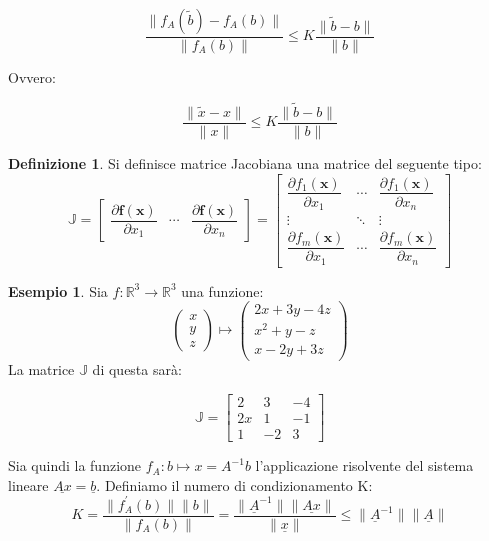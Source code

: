 \documentclass[12pt, a4paper]{book}
\theoremstyle{definition}
\newtheorem{exmp}{Esempio}[section]
\newtheorem{defn}{Definizione}[section]
\newcommand{\VarMtrx}[1]{\ensuremath{\underline{#1}}}
\begin{document}
\begin{flushleft}
\[ 
	\frac{ \lVert f_{A}(\tilde{b}) - f_{A}(b)\rVert }{ \lVert  f_{A}(b) \rVert} \leq K  \frac{ \lVert \tilde{b} - b \rVert }{ \lVert  b \rVert}
\]

Ovvero: 

\[ 
	\frac{ \lVert \tilde{x} - x \rVert }{ \lVert x \rVert} \leq K  \frac{ \lVert \tilde{b} - b \rVert }{ \lVert  b \rVert}
\]


\begin{defn}
Si definisce matrice Jacobiana una matrice del seguente tipo: 
\[
	\mathbb{J}=\left[\begin{array}{ccc}
	\dfrac{\partial \mathbf{f}(\mathbf{x})}{\partial x_{1}} & \cdots & \dfrac{\partial \mathbf{f}(\mathbf{x})}{\partial x_{n}}
	\end{array}\right]=\left[\begin{array}{ccc}
	\dfrac{\partial f_{1}(\mathbf{x})}{\partial x_{1}} & \cdots & \dfrac{\partial f_{1}(\mathbf{x})}{\partial x_{n}} \\
	\vdots & \ddots & \vdots \\
	\dfrac{\partial f_{m}(\mathbf{x})}{\partial x_{1}} & \cdots & \dfrac{\partial f_{m}(\mathbf{x})}{\partial x_{n}}
	\end{array}\right]
\]
\end{defn}
\begin{exmp}
Sia $f: \mathbb{R}^{3} \rightarrow \mathbb{R}^{3}$ una funzione:
\[ 
	\begin{pmatrix} x \\ y \\ z  \end{pmatrix} \mapsto \begin{pmatrix} 2x + 3y - 4z \\ x^{2} + y -z \\ x - 2y + 3z  \end{pmatrix} 
\]
La matrice $\mathbb{J}$ di questa sarà: 

\[ 
	\mathbb{J} = 
			\begin{bmatrix}
				2 & 3 & -4 \\
				2x & 1 & -1 \\
				1 & -2 & 3
			\end{bmatrix}
\]
\end{exmp}
Sia quindi la funzione $f_{A}: b \mapsto x = A^{-1}b$ l'applicazione risolvente del sistema lineare $\VarMtrx{Ax} = \VarMtrx{b}$. Definiamo il numero di condizionamento K: 
\[ 
	K = \frac{\lVert f^{'}_{A}(b)\rVert \lVert b\rVert}{\lVert f_{A}(b)\rVert} 
	   = \frac{\lVert \VarMtrx{A}^{-1} \rVert \lVert \VarMtrx{Ax} \rVert}{\lVert \VarMtrx{x} \rVert} 
	   \leq \lVert \VarMtrx{A}^{-1} \rVert \lVert \VarMtrx{A} \rVert 
\]


\end{flushleft}
\end{document}
